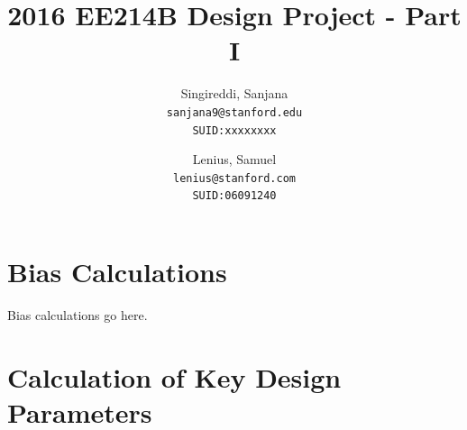 \documentclass[12pt,a4paper]{article}
\begin{document}




\author{
  Singireddi, Sanjana\\
  \texttt{sanjana9@stanford.edu}\\
  \texttt{SUID:xxxxxxxx}
  \and
  Lenius, Samuel\\
  \texttt{lenius@stanford.com}\\
  \texttt{SUID:06091240}
}

\title{2016 EE214B Design Project - Part I}

\maketitle

\pagebreak



\section{Bias Calculations}
\par

Bias calculations go here.\par


\pagebreak


\section{Calculation of Key Design Parameters}
\end{document}
